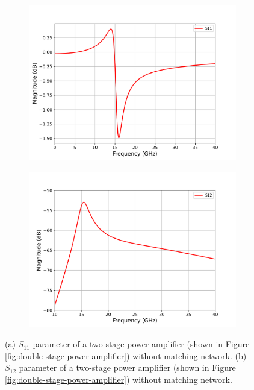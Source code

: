 \begin{figure}[H]
  \centering
  \begin{subfigure}{0.49\textwidth}
    \centering
    \includegraphics[width=\linewidth]{figures/two_stage_s11.png}
    \caption{}
    \label{fig:two-stage-without-cadence-s11}
  \end{subfigure}
  \hfill
  \begin{subfigure}{0.49\textwidth}
    \centering
    \includegraphics[width=\linewidth]{figures/two_stage_s12.png}
    \caption{}
     \label{fig:two-stage-without-cadence-s12}
  \end{subfigure}
  \caption{(a) $S_{11}$ parameter of a two-stage power amplifier (shown in Figure \ref{fig:double-stage-power-amplifier}) without matching network. (b) $S_{12}$ parameter of a two-stage power amplifier (shown in Figure \ref{fig:double-stage-power-amplifier}) without matching network.}
  \label{fig:two-stage-without-cadence-s11-s12}
\end{figure}

